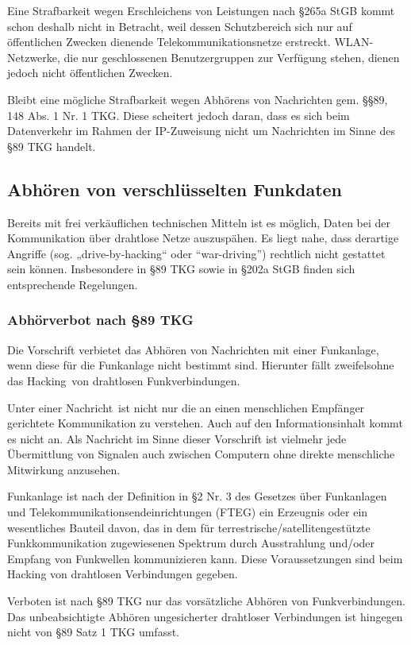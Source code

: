 \documentclass[10pt,a4paper]{article}
\begin{document}
Eine Strafbarkeit wegen Erschleichens von Leistungen nach §265a StGB kommt schon deshalb nicht in Betracht, weil dessen Schutzbereich sich nur auf öffentlichen Zwecken dienende Telekommunikationsnetze erstreckt. WLAN-Netzwerke, die nur geschlossenen Benutzergruppen zur Verfügung stehen, dienen jedoch nicht öffentlichen Zwecken.

Bleibt eine mögliche Strafbarkeit wegen Abhörens von Nachrichten gem. §§89, 148 Abs. 1 Nr. 1 TKG. Diese scheitert jedoch daran, dass es sich beim Datenverkehr im Rahmen der IP-Zuweisung nicht um Nachrichten im Sinne des §89 TKG handelt.

\subsection*{Abhören von verschlüsselten Funkdaten}
Bereits mit frei verkäuflichen technischen Mitteln ist es möglich, Daten bei der Kommunikation über drahtlose Netze auszuspähen. Es liegt nahe, dass derartige Angriffe (sog. „drive-by-hacking“ oder “war-driving”) rechtlich nicht gestattet sein können. Insbesondere in §89 TKG sowie in §202a StGB finden sich entsprechende Regelungen.


\subsubsection*{Abhörverbot nach §89 TKG}
Die Vorschrift verbietet das Abhören von Nachrichten mit einer Funkanlage, wenn diese für die Funkanlage nicht bestimmt sind. Hierunter fällt zweifelsohne das \glqq Hacking\grqq \ von drahtlosen Funkverbindungen.

Unter einer \glqq Nachricht\grqq \ ist nicht nur die an einen menschlichen Empfänger gerichtete Kommunikation zu verstehen. Auch auf den Informationsinhalt kommt es nicht an. Als Nachricht im Sinne dieser Vorschrift ist vielmehr jede Übermittlung von Signalen auch zwischen Computern ohne direkte menschliche Mitwirkung anzusehen.

Funkanlage ist nach der Definition in §2 Nr. 3 des Gesetzes über Funkanlagen und Telekommunikationsendeinrichtungen (FTEG) \glqq ein Erzeugnis oder ein wesentliches Bauteil davon, das in dem für terrestrische/satellitengestützte Funkkommunikation zugewiesenen Spektrum durch Ausstrahlung und/oder Empfang von Funkwellen kommunizieren kann\grqq. Diese Voraussetzungen sind beim Hacking von drahtlosen Verbindungen gegeben.

Verboten ist nach §89 TKG nur das vorsätzliche Abhören von Funkverbindungen. Das unbeabsichtigte Abhören ungesicherter drahtloser Verbindungen ist hingegen nicht von §89 Satz 1 TKG umfasst.
\end{document}
